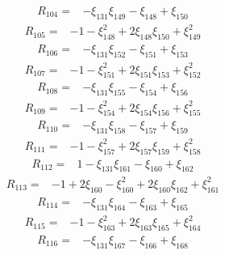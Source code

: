 \[
\begin{aligned}
 R_{104}={}&-\xi_{131}\xi_{149}-\xi_{148}+\xi_{150}
\end{aligned}
\]
\[
\begin{aligned}
 R_{105}={}&-1-\xi_{148}^{2}+2\xi_{148}\xi_{150}+\xi_{149}^{2}
\end{aligned}
\]
\[
\begin{aligned}
 R_{106}={}&-\xi_{131}\xi_{152}-\xi_{151}+\xi_{153}
\end{aligned}
\]
\[
\begin{aligned}
 R_{107}={}&-1-\xi_{151}^{2}+2\xi_{151}\xi_{153}+\xi_{152}^{2}
\end{aligned}
\]
\[
\begin{aligned}
 R_{108}={}&-\xi_{131}\xi_{155}-\xi_{154}+\xi_{156}
\end{aligned}
\]
\[
\begin{aligned}
 R_{109}={}&-1-\xi_{154}^{2}+2\xi_{154}\xi_{156}+\xi_{155}^{2}
\end{aligned}
\]
\[
\begin{aligned}
 R_{110}={}&-\xi_{131}\xi_{158}-\xi_{157}+\xi_{159}
\end{aligned}
\]
\[
\begin{aligned}
 R_{111}={}&-1-\xi_{157}^{2}+2\xi_{157}\xi_{159}+\xi_{158}^{2}
\end{aligned}
\]
\[
\begin{aligned}
 R_{112}={}&1-\xi_{131}\xi_{161}-\xi_{160}+\xi_{162}
\end{aligned}
\]
\[
\begin{aligned}
 R_{113}={}&-1+2\xi_{160}-\xi_{160}^{2}+2\xi_{160}\xi_{162}+\xi_{161}^{2}
\end{aligned}
\]
\[
\begin{aligned}
 R_{114}={}&-\xi_{131}\xi_{164}-\xi_{163}+\xi_{165}
\end{aligned}
\]
\[
\begin{aligned}
 R_{115}={}&-1-\xi_{163}^{2}+2\xi_{163}\xi_{165}+\xi_{164}^{2}
\end{aligned}
\]
\[
\begin{aligned}
 R_{116}={}&-\xi_{131}\xi_{167}-\xi_{166}+\xi_{168}
\end{aligned}
\]
